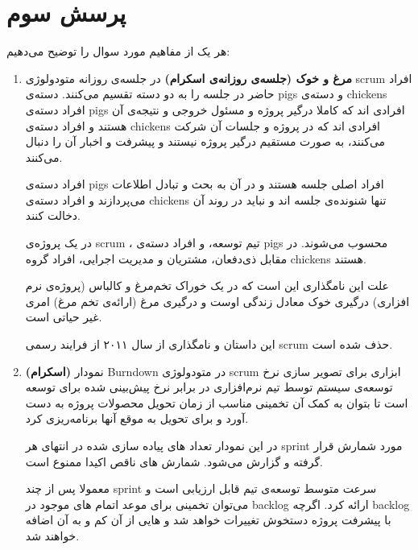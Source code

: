 
\section{پرسش سوم}
هر یک از مفاهیم مورد سوال را توضیح می‌دهیم:
\begin{enumerate}[i]
\item \textbf{مرغ و خوک (جلسه‌ی روزانه‌ی اسکرام)} \newline
در جلسه‌ی روزانه‌ متودولوژی scrum افراد حاضر در جلسه را به دو دسته تقسیم می‌کنند. دسته‌ی pigs و دسته‌ی chickens افراد دسته‌ی pigs افرادی اند که کاملا درگیر پروژه و مسئول خروجی و نتیجه‌ی آن هستند و افراد دسته‌ی ‌chickens افرادی اند که در پروژه و جلسات آن شرکت می‌کنند، به صورت مستقیم درگیر پروژه نیستند و پیشرفت و اخبار آن را دنبال می‌کنند.

افراد دسته‌ی pigs افراد اصلی جلسه هستند و در آن به بحث و تبادل اطلاعات می‌پردازند و افراد دسته‌ی chickens تنها شنونده‌ی جلسه اند و نباید در روند آن دخالت کنند.

در یک پروژه‌ی scrum  ، تیم توسعه، 
و
افراد دسته‌ی pigs محسوب می‌شوند. در مقابل  ذی‌دفعان، مشتریان و مدیریت اجرایی، افراد گروه chickens هستند.

علت این نامگذاری این است که در یک خوراک تخم‌مرغ و کالباس (پروژه‌ی نرم افزاری) درگیری خوک معادل زندگی اوست و درگیری مرغ (ارائه‌ی تخم مرغ)  امری غیر حیاتی است.

این داستان و نامگذاری از سال ۲۰۱۱ از فرایند رسمی scrum حذف شده است.

\cite{the-chicken-and-the-pig}

\item \textbf{ (اسکرام)} \newline
نمودار Burndown در متودولوژی scrum ابزاری برای تصویر سازی نرخ توسعه‌ی سیستم توسط تیم نرم‌افزاری در برابر نرخ پیش‌بینی شده برای توسعه است تا بتوان به کمک آن تخمینی مناسب از زمان تحویل محصولات پروژه به دست آورد و برای تحویل به موقع آنها برنامه‌ریزی کرد.

در این نمودار تعداد 
‌های پیاده سازی شده در انتهای هر sprint مورد شمارش قرار گرفته و گزارش می‌شود. شمارش
های ناقص اکیدا ممنوع است.

معمولا پس از چند sprint سرعت متوسط توسعه‌ی تیم قابل ارزیابی است و می‌توان تخمینی برای موعد اتمام 
های موجود در backlog ارائه کرد. اگرچه 
backlog
با پیشرفت پروژه دستخوش تغییرات خواهد شد و 
هایی از آن کم و به آن اضافه خواهند شد.




\end{enumerate}
